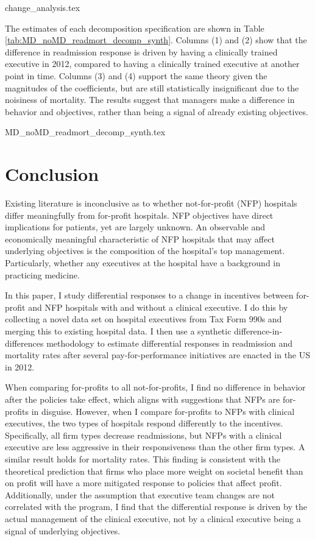 \documentclass[12pt]{article}
\begin{document}
     {change_analysis.tex}

    The estimates of each decomposition specification are shown in Table \ref{tab:MD_noMD_readmort_decomp_synth}. Columns (1) and (2) show that the difference in readmission response is driven by having a clinically trained executive in 2012, compared to having a clinically trained executive at another point in time. Columns (3) and (4) support the same theory given the magnitudes of the coefficients, but are still statistically insignificant due to the noisiness of mortality. The results suggest that managers make a difference in behavior and objectives, rather than being a signal of already existing objectives. 

    {MD_noMD_readmort_decomp_synth.tex}


    \section{Conclusion}

    Existing literature is inconclusive as to whether not-for-profit (NFP) hospitals differ meaningfully from for-profit hospitals. NFP objectives have direct implications for patients, yet are largely unknown. An observable and economically meaningful characteristic of NFP hospitals that may affect underlying objectives is the composition of the hospital's top management. Particularly, whether any executives at the hospital have a background in practicing medicine.

    In this paper, I study differential responses to a change in incentives between for-profit and NFP hospitals with and without a clinical executive. I do this by collecting a novel data set on hospital executives from Tax Form 990s and merging this to existing hospital data. I then use a synthetic difference-in-differences methodology to estimate differential responses in readmission and mortality rates after several pay-for-performance initiatives are enacted in the US in 2012. 
    
     When comparing for-profits to all not-for-profits, I find no difference in behavior after the policies take effect, which aligns with suggestions that NFPs are for-profits in disguise. However, when I compare for-profits to NFPs with clinical executives, the two types of hospitals respond differently to the incentives. Specifically, all firm types decrease readmissions, but NFPs with a clinical executive are less aggressive in their responsiveness than the other firm types. A similar result holds for mortality rates. This finding is consistent with the theoretical prediction that firms who place more weight on societal benefit than on profit will have a more mitigated response to policies that affect profit. Additionally, under the assumption that executive team changes are not correlated with the program, I find that the differential response is driven by the actual management of the clinical executive, not by a clinical executive being a signal of underlying objectives. 
     
\end{document}
